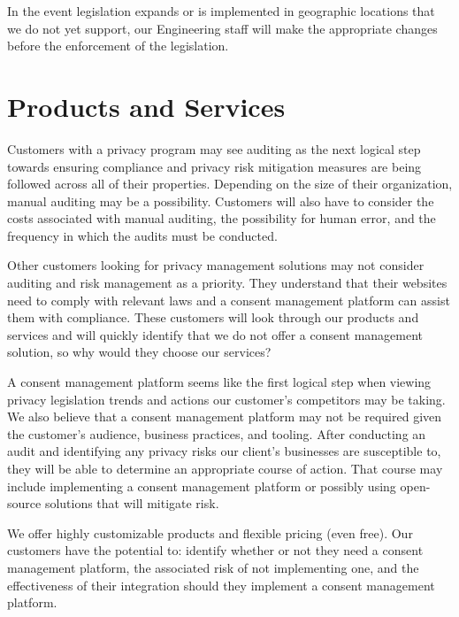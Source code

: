 In the event legislation expands or is implemented in geographic locations that we do not yet support, our Engineering staff will make the appropriate changes before the enforcement of the legislation.


\section{Products and Services}

Customers with a privacy program may see auditing as the next logical step towards ensuring compliance and privacy risk mitigation measures are being followed across all of their properties. Depending on the size of their organization, manual auditing may be a possibility. Customers will also have to consider the costs associated with manual auditing, the possibility for human error, and the frequency in which the audits must be conducted. 

Other customers looking for privacy management solutions may not consider auditing and risk management as a priority. They understand that their websites need to comply with relevant laws and a consent management platform can assist them with compliance. These customers will look through our products and services and will quickly identify that we do not offer a consent management solution, so why would they choose our services?

A consent management platform seems like the first logical step when viewing privacy legislation trends and actions our customer's competitors may be taking. We also believe that a consent management platform may not be required given the customer's audience, business practices, and tooling. After conducting an audit and identifying any privacy risks our client's businesses are susceptible to, they will be able to determine an appropriate course of action. That course may include implementing a consent management platform or possibly using open-source solutions that will mitigate risk.

We offer highly customizable products and flexible pricing (even free). Our customers have the potential to: identify whether or not they need a consent management platform, the associated risk of not implementing one, and the effectiveness of their integration should they implement a consent management platform.


